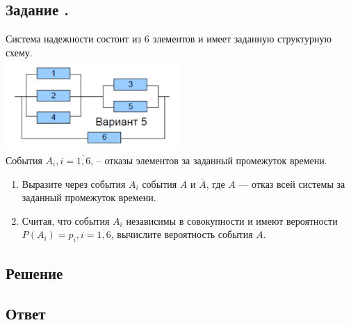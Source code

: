\documentclass[12pt]{article}
\begin{document}
\subsection{Задание .}
Система надежности состоит из 6 элементов и имеет заданную структурную схему. \\
\includegraphics{1.png} \\
События $A_i, i=\overline{1, 6}$, -- отказы элементов за заданный промежуток времени.
\begin{enumerate}
	\item Выразите через события $A_i$ события $A$ и $\overline{A}$, где $A$ — отказ всей системы за заданный промежуток времени.
	\item Считая, что события $A_i$ независимы в совокупности и имеют вероятности $P(A_i)=p_i, i = \overline{1,6}$, вычислите вероятность события $A$.
\end{enumerate}
\subsection*{Решение}
\subsection*{Ответ}
\end{document}
